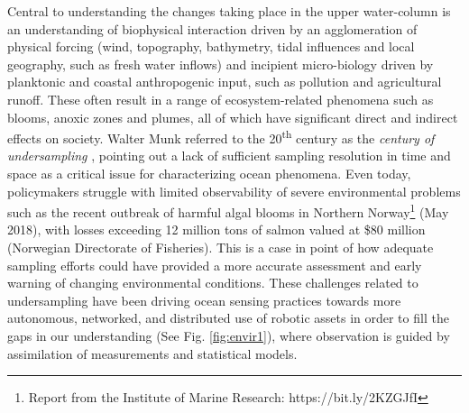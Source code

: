 \documentclass[aoas]{imsart}
\begin{document}
Central to understanding the changes taking place in the upper
water-column is an understanding of biophysical interaction driven by
an agglomeration of physical forcing (wind, topography, bathymetry,
tidal influences and local geography, such as fresh water inflows)
and incipient micro-biology driven by planktonic and coastal
anthropogenic input, such as pollution and agricultural runoff. These
often result in a range of ecosystem-related phenomena such as blooms,
anoxic zones and plumes, all of which have significant direct and indirect effects  on society. Walter Munk referred to the
20\textsuperscript{th} century as the \emph{century of undersampling}
\citep{munk2002}, pointing out a lack of sufficient sampling
resolution in time and space as a critical issue for characterizing
ocean phenomena. Even today, policymakers struggle with limited
observability of severe environmental problems such as the recent outbreak of harmful algal blooms in Northern
Norway\footnote{Report from the Institute of Marine
  Research: https://bit.ly/2KZGJfI} (May 2018), with losses exceeding 12 million
tons of salmon valued at \$80 million (Norwegian Directorate of
Fisheries). This is a case in point of how adequate sampling efforts
could have provided a more accurate assessment and early
warning of changing environmental conditions. These challenges related to undersampling have been driving
ocean sensing practices towards more autonomous, networked, and
distributed use of robotic assets in order to fill the gaps in our
understanding (See Fig. \ref{fig:envir1}), where observation is
guided by assimilation of measurements and statistical models. 
\end{document}
